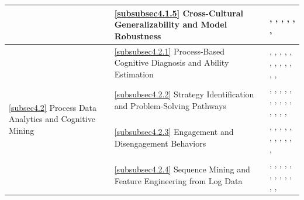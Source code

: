\documentclass{ieeeaccess}
\begin{document}
\begin{table}[!t]
\begin{tabular}{p{2.7cm}p{6.7cm}p{6.8cm}}
& \ref{subsubsec4.1.5} Cross-Cultural Generalizability and Model Robustness
& \cite{ye-yuan2022}, \cite{zhang-cutumisu2024}, \cite{wan-etal2025}, \cite{wang-king-haw-leung2022}, \cite{bomanInfluenceSESMigration2024}, \cite{bernardoMetacognitiveReadingStrategies2023}, \cite{yildirimUnderstandingStudentsMathematical2026}\\
\midrule

\multirow{4}{=}{\parbox[t]{2.8cm}{\ref{subsec4.2} Process Data Analytics and Cognitive Mining}}
& \ref{subsubsec4.2.1} Process-Based Cognitive Diagnosis and Ability Estimation
& \cite{bungaro-etal2024}, \cite{zhang-etal2023}, \cite{costa-etal2021}, \cite{liang-etal2023}, \cite{zhan-qiao2022}, \cite{sun-etal2023}, \cite{costa-chen2023}, \cite{greyCapturingSparkPISA2024}, \cite{wuNewPerspectiveMemorization2020}, \cite{sirganciAMachineLearning2023}, \cite{weiUnderstandingMathematicsAnxiety2026}, \cite{mirandaDevelopmentINSVAGRAMEnglish2021}, \cite{kuangEvaluatingNeuralNetworks2026}\\
\addlinespace

& \ref{subsubsec4.2.2} Strategy Identification and Problem-Solving Pathways
& \cite{fn-aydin-etal2025}, \cite{deschipper-etal2025}, \cite{salles-etal2020}, \cite{teig2023}, \cite{park-etal2023}, \cite{pejic-etal2021}, \cite{lee-etalUncoveringBehavioralPatterns2025}, \cite{han-etal2023}, \cite{wijayaExploringContributingFactors2024}, \cite{liuHowLearningTime2023}, \cite{kusmaryonoEvaluatingResultsPISA2023}, \cite{delpratoCognitiveNoncognitiveEfficiency2026}, \cite{miaoMachineLearningEvidence2023}, \cite{aliAreSchoolsBecoming2024}, \cite{tzeSimilaritiesDifferencesSocial2022}\\
\addlinespace

& \ref{subsubsec4.2.3} Engagement and Disengagement Behaviors
& \cite{ding-etal2025}, \cite{guo-etal-ercikan2024}, \cite{guo-etal-worthington2024}, \cite{shin-etal2024}, \cite{erdem-kara-basak2025}, \cite{detaPISAScienceFramework2024}, \cite{alnahdiImpactGenderDifferences2023}, \cite{odellScopingReviewRelationship2020}, \cite{maoAIrelatedMeasuresSelfreported2026}, \cite{shenToolsWellbeingAI2026}, \cite{lopez-menesesArtificialIntelligenceEducational2025}, \cite{pongsophonContrastiveModellingSelfregulated2026}\\
\addlinespace

& \ref{subsubsec4.2.4} Sequence Mining and Feature Engineering from Log Data
& \cite{ulitzsch-etal2021}, \cite{tang-etal2021}, \cite{chen-etal2023}, \cite{gong-etal2023}, \cite{ludwig-etal2024}, \cite{yun-etal2025}, \cite{zhou-etal2024}, \cite{wuAnalyzingScientificLiteracy2025}, \cite{robitzschChoiceItemResponse2022}, \cite{michaelMediatingEffectsMotivation2023}, \cite{krausEssenceCreativeThinking2026}, \cite{wuPredictingKeyFactors2026}, \cite{heUnderstandingAdultsSpatial2026}\\
\midrule


\end{tabular}
\end{table}
\end{document}
